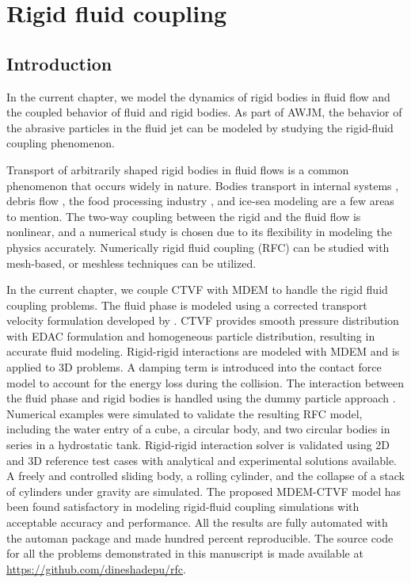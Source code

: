\chapter{Rigid fluid coupling}
\label{chap:rfc}

\section{Introduction}
\label{sec:intro}
In the current chapter, we model the dynamics of rigid bodies in fluid flow and
the coupled behavior of fluid and rigid bodies. As part of AWJM, the behavior of
the abrasive particles in the fluid jet can be modeled by studying the
rigid-fluid coupling phenomenon.

Transport of arbitrarily shaped rigid bodies in fluid flows is a common
phenomenon that occurs widely in nature. Bodies transport in internal systems
\citep{Dai2021}, debris flow \citep{Qingyun2022}, the food processing industry
\citep{Karunasena2014}, and ice-sea modeling \citep{Mintu2018} are a few areas to
mention. The two-way coupling between the rigid and the fluid flow is nonlinear,
and a numerical study is chosen due to its flexibility in modeling the physics
accurately. Numerically rigid fluid coupling (RFC) can be studied with
mesh-based, or meshless techniques can be utilized.


In the current chapter, we couple CTVF with MDEM to handle the rigid fluid
coupling problems. The fluid phase is modeled using a corrected transport
velocity formulation developed by \citep{adepu2021corrected}. CTVF provides
smooth pressure distribution with EDAC formulation and homogeneous particle
distribution, resulting in accurate fluid modeling. Rigid-rigid interactions are
modeled with MDEM and is applied to 3D problems. A damping term is introduced
into the contact force model to account for the energy loss during the
collision. The interaction between the fluid phase and rigid bodies is handled
using the dummy particle approach \citep{Adami2012}.
Numerical examples were simulated to validate the resulting RFC model, including
the water entry of a cube, a circular body, and two circular bodies in series in
a hydrostatic tank. Rigid-rigid interaction solver is validated using 2D and 3D
reference test cases with analytical and experimental solutions available. A
freely and controlled sliding body, a rolling cylinder, and the collapse of a
stack of cylinders under gravity are simulated.
The proposed MDEM-CTVF model has been found satisfactory in modeling
rigid-fluid coupling simulations with acceptable accuracy and performance. All
the results are fully automated with the automan package \citep{automan2018} and
made hundred percent reproducible. The source code for all the problems
demonstrated in this manuscript is made available at
\url{https://github.com/dineshadepu/rfc}.


